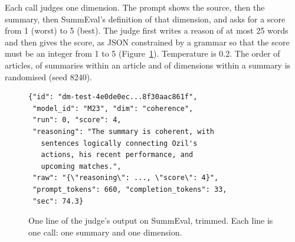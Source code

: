 \documentclass[11pt]{article}
\begin{document}
Each call judges one dimension. The prompt shows the source, then the summary, then SummEval's definition of that dimension, and asks for a score from 1 (worst) to 5 (best). The judge first writes a reason of at most 25 words and then gives the score, as JSON constrained by a grammar so that the score must be an integer from 1 to 5 (Figure~\ref{fig:judge}). Temperature is 0.2. The order of articles, of summaries within an article and of dimensions within a summary is randomised (seed 8240).

\begin{figure}[t]
\footnotesize
\begin{verbatim}
{"id": "dm-test-4e0de0ec...8f30aac861f",
 "model_id": "M23", "dim": "coherence",
 "run": 0, "score": 4,
 "reasoning": "The summary is coherent, with
   sentences logically connecting Ozil's
   actions, his recent performance, and
   upcoming matches.",
 "raw": "{\"reasoning\": ..., \"score\": 4}",
 "prompt_tokens": 660, "completion_tokens": 33,
 "sec": 74.3}
\end{verbatim}
\caption{One line of the judge's output on SummEval, trimmed. Each line is one call: one summary and one dimension.}
\label{fig:judge}
\end{figure}
\end{document}
